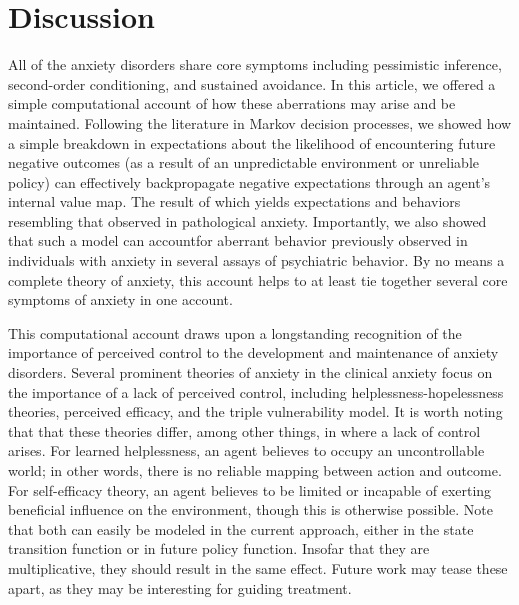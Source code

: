 \documentclass[11pt]{article} %
\begin{document}
\section{Discussion}

All of the anxiety disorders share core symptoms including pessimistic inference, second-order conditioning, and sustained avoidance. In this article, we offered a simple computational account of how these aberrations may arise and be maintained. Following the literature in Markov decision processes, we showed how a simple breakdown in expectations about the likelihood of encountering future negative outcomes (as a result of an unpredictable environment or unreliable policy) can effectively backpropagate negative expectations through an agent's internal value map. The result of which yields expectations and behaviors resembling that observed in pathological anxiety. Importantly, we also showed that such a model can accountfor aberrant behavior previously observed in individuals with anxiety in several assays of psychiatric behavior. By no means a complete theory of anxiety, this account helps to at least tie together several core symptoms of anxiety in one account.

This computational account draws upon a longstanding recognition of the importance of perceived control to the development and maintenance of anxiety disorders. Several prominent theories of anxiety in the clinical anxiety focus on the importance of a lack of perceived control, including helplessness-hopelessness theories, perceived efficacy, and the triple vulnerability model. It is worth noting that that these theories differ, among other things, in where a lack of control arises. For learned helplessness, an agent believes to occupy an uncontrollable world; in other words, there is no reliable mapping between action and outcome. For self-efficacy theory, an agent believes to be limited or incapable of exerting beneficial influence on the environment, though this is otherwise possible. Note that both can easily be modeled in the current approach, either in the state transition function or in future policy function. Insofar that they are multiplicative, they should result in the same effect. Future work may tease these apart, as they may be interesting for guiding treatment.
\end{document}
